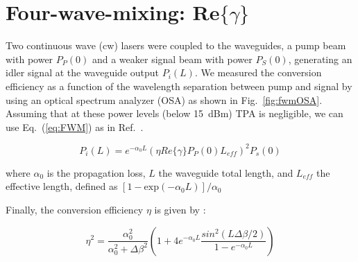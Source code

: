 
\section{Four-wave-mixing: Re$\{ \gamma \}$}
Two continuous wave (cw) lasers were coupled to the waveguides, a pump beam with power $P_P(0)$ and a weaker signal beam with power $P_S(0)$, generating an idler signal at the waveguide output $P_i(L)$.
We measured the conversion efficiency as a function of the wavelength separation between pump and signal by using an optical spectrum analyzer (OSA) as shown in Fig.~\ref{fig:fwmOSA}.
Assuming that at these power levels (below 15~dBm) TPA is negligible, we can use Eq.~(\ref{eq:FWM}) as in Ref.~\cite{Vallaitis2009}.







\begin{equation}
        P_i(L)=e^{-\alpha_0L}(\eta Re\{\gamma\}P_P(0)L_{eff})^2 P_s(0)
\label{eq:FWM}
\end{equation}


where $\alpha_0$ is the propagation loss, $L$ the waveguide total length, and $ L_{eff} $ the effective length, defined as $[ 1-\mathrm{exp}(-\alpha_0 L)] / \alpha_0 $


Finally, the conversion efficiency $\eta$ is given by \cite{Kung2003,Systems2004}:

\begin{equation}
        \eta ^2=\frac{\alpha_0^2}{\alpha_0^2+\Delta \beta^2}\left( 1+ 4e^{-\alpha_0L}\frac{sin^2(L\Delta\beta/2)}{1-e^{-\alpha_0L}} \right)
\end{equation}

